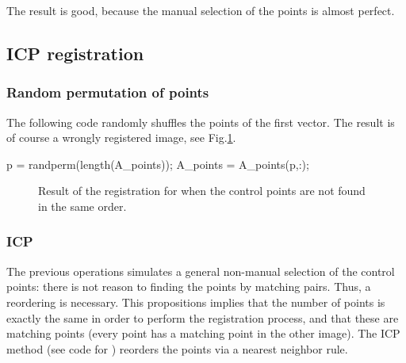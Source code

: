 The result is good, because the manual selection of the points is almost perfect.

\subsection{ICP registration}

\subsubsection{Random permutation of points}
The following code randomly shuffles the points of the first vector. The result is of course a wrongly registered image, see Fig.\ref{fig:registration:matlab:random}.
\begin{matlab}
p = randperm(length(A_points));
A_points = A_points(p,:);
\end{matlab}

\begin{figure}[htbp]
\centering
 \hfill
 
 \caption{Result of the registration for when the control points are not found in the same order.}
 \label{fig:registration:matlab:random}
\end{figure}


\subsubsection{ICP}
The previous operations simulates a general non-manual selection of the control points: there is not reason to finding the points by matching pairs. Thus, a reordering is necessary. This propositions implies that the number of points is exactly the same in order to perform the registration process, and that these are matching points (every point has a matching point in the other image). The ICP method (see code for ) reorders the points via a nearest neighbor rule.

